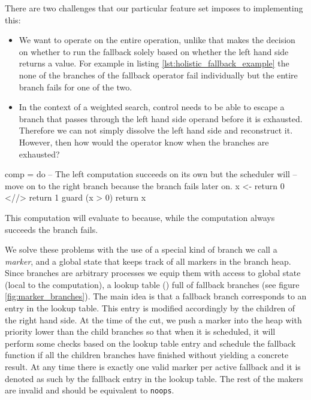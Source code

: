There are two challenges that our particular feature set imposes to
implementing this:

\begin{itemize}
\item We want \hask{<//>} to operate on the entire operation, unlike
  \cite{kiselyovBacktrackingInterleavingTerminating} that makes the
  decision on whether to run the fallback solely based on whether the
  left hand side returns a value. For example in listing \ref{lst:holistic_fallback_example}
  the none of the branches of the fallback operator fail individually
  but the entire branch fails for one of the two.
\item In the context of a weighted search, control needs to be able to
  escape a branch that passes through the left hand side operand
  before it is exhausted. Therefore we can not simply dissolve the
  left hand side and reconstruct it. However, then how would the operator
  know when the branches are exhausted?
\end{itemize}

\begin{code}
\begin{haskellcode}
comp = do
  -- The left computation succeeds on its own  but the scheduler will
  -- move on to the right branch because the branch fails later on.
  x <- return 0 <//> return 1
  guard (x > 0)
  return x
\end{haskellcode}
\caption{\label{lst:holistic_fallback_example}This computation will evaluate to  because, while the computation  always succeeds the branch fails.}
\end{code}

We solve these problems with the use of a special kind of branch we
call a \emph{marker}, and a global state that keeps track of all
markers in the branch heap. Since branches are arbitrary processes we
equip them with access to global state (local to the computation), a
lookup table () full of fallback branches (see figure
\ref{fig:marker_branches}).  The main idea is that a fallback branch
corresponds to an entry in the lookup table. This entry is modified
accordingly by the children of the right hand side. At the time of the
cut, we push a marker into the heap with priority lower than the child
branches so that when it is scheduled, it will perform some checks
based on the lookup table entry and schedule the fallback function if
all the children branches have finished without yielding a concrete
result. At any time there is exactly one valid marker per active
fallback and it is denoted as such by the fallback entry in the lookup
table. The rest of the makers are invalid and should be equivalent to
\texttt{noops}.

